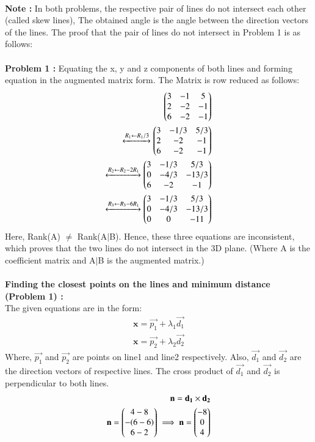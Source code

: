 \documentclass[journal,12pt,twocolumn]{IEEEtran}
\begin{document}
\\
\textbf{Note :} In both problems, the respective pair of lines do not intersect each other (called skew lines), The obtained angle is the angle between the direction vectors of the lines. The proof that the pair of lines do not intersect in Problem 1 is as follows:\\
\\
\textbf{Problem 1 :} Equating the x, y and z components of both lines and forming equation in the augmented matrix form. The Matrix is row reduced as follows:
\begin{align}
\begin{pmatrix}3 & -1 & 5\\2 & -2 & -1\\6 &-2&-1\end{pmatrix}\\
\xleftrightarrow[]{R_1\leftarrow R_1/3}
\begin{pmatrix}3 & -1/3 & 5/3 \\2 & -2 & -1\\6 &-2&-1\end{pmatrix}\\
\xleftrightarrow[]{R_2\leftarrow R_2-2R_1}   
\begin{pmatrix}3 & -1/3 & 5/3\\0 & -4/3 & -13/3\\6 &-2&-1\end{pmatrix}\\
\xleftrightarrow[]{R_3\leftarrow R_3-6R_1}
\begin{pmatrix}3 & -1/3 & 5/3\\0 & -4/3 & -13/3\\0 &0&-11\end{pmatrix}
\end{align} 
Here, Rank(A) $\neq$ Rank(A$\mid$B). Hence, these three equations are inconsistent, which proves that the two lines do not intersect in the 3D plane. (Where A is the coefficient matrix and A$\mid$B is the augmented matrix.) \\
\\
\textbf{Finding the closest points on the lines and minimum distance (Problem 1) :}
\\
The given equations are in the form:
\begin{align}
    \textbf{x}=\vec{p_1} + \lambda_1\vec{d_1}\\
    \textbf{x}=\vec{p_2} + \lambda_2\vec{d_2}
\end{align}
Where, $\vec{p_1}$ and $\vec{p_2}$ are points on line1 and line2 respectively. Also, $\vec{d_1}$ and $\vec{d_2}$ are the direction vectors of respective lines.
The cross product of $\vec{d_1}$ and $\vec{d_2}$ is perpendicular to both lines.
\begin{align}
    \mathbf{n} = \mathbf{d_1} \times \mathbf{d_2}\\
     \mathbf{n}=\begin{pmatrix}4-8 \\ -(6-6) \\ 6-2\end{pmatrix}
     \implies \mathbf{n}=\begin{pmatrix}-8 \\ 0 \\ 4\end{pmatrix}
\end{align}
\end{document}
